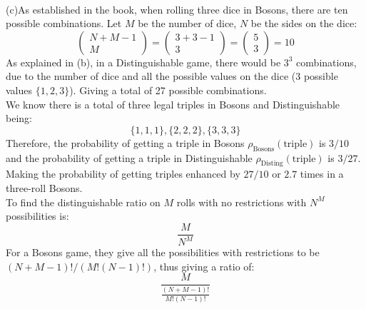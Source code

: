 \documentclass[11pt]{article}
\newcommand{\Matrix}[1]{\begin{pmatrix} #1 \end{pmatrix}}
\theoremstyle{pink}
\theoremstyle{boxedsolution}
\theoremstyle{definition}
\theoremstyle{claim}
\begin{document}
\vspace{5mm}
\\(c)As established in the book, when rolling three dice in Bosons, there are ten possible combinations. Let $M$ be the number of dice, $N$ be the sides on the dice:
\[\Matrix{N+M-1 \\ M}=\Matrix{3+3-1 \\ 3}=\Matrix{5 \\ 3}=10\]
As explained in (b), in a Distinguishable game, there would be $3^3$ combinations, due to the number of dice and all the possible values on the dice (3 possible values $\{1,2,3\}$). Giving a total of 27 possible combinations.
\\We know there is a total of three legal triples in Bosons and Distinguishable being:
\[\{1,1,1\},\{2,2,2\},\{3,3,3\}\]
Therefore, the probability of getting a triple in Bosons $\rho_{\text{Bosons}}(\text{triple})$ is $3/10$ and the probability of getting a triple in Distinguishable $\rho_{\text{Disting}}(\text{triple})$ is $3/27$. Making the probability of getting triples enhanced by $27/10$ or $2.7$ times in a three-roll Bosons.
  \vspace{5mm}
  \\To find the distinguishable ratio on $M$ rolls with no restrictions with $N^M$ possibilities is:
  \[\frac{M}{N^M}\]
  For a Bosons game, they give all the possibilities with restrictions to be $(N+M-1)!/(M!(N-1)!)$, thus giving a ratio of:
  \[\frac{M}{\frac{(N+M-1)!}{M!(N-1)!}}\]

 

\newpage
\end{document}
